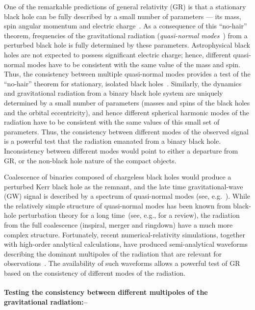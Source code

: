 \documentclass[prl,preprintnumbers,twocolumn,eqsecnum,floatfix,a4paper,nofootinbib,superscriptaddress]{revtex4}
\begin{document}
One of the remarkable predictions of general relativity (GR) is that a stationary black hole can be fully described by a small number of parameters --- its mass, spin angular momentum and electric charge~\cite{Israel:1967,Israel:1968,Carter:1978}. As a consequence of this ``no-hair'' theorem, frequencies of the gravitational radiation (\emph{quasi-normal modes}~\cite{Vishveshwara:1970zz,Press:1971wr,Chandrasekhar:1975zza}) from a perturbed black hole is fully determined by these parameters. Astrophysical black holes are not expected to possess significant electric charge; hence, different quasi-normal modes have to be consistent with the same value of the mass and spin. Thus, the consistency between multiple quasi-normal modes provides a test of the ``no-hair'' theorem for stationary, isolated black holes~\cite{Dreyer:2003bv}. Similarly, the dynamics and gravitational radiation from a binary black hole system are uniquely determined by a small number of parameters (masses and spins of the black holes and the orbital eccentricity), and hence different spherical harmonic modes of the radiation have to be consistent with the same values of this small set of parameters. Thus, the consistency between different modes of the observed signal is a powerful test that the radiation emanated from a binary black hole. Inconsistency between different modes would point to either a departure from GR, or the non-black hole nature of the compact objects. 

Coalescence of binaries composed of chargeless black holes would produce a perturbed Kerr black hole as the remnant, and the late time gravitational-wave (GW) signal is described by a spectrum of quasi-normal modes (see, e.g.~\cite{Buonanno:2006ui}). While the relatively simple structure of quasi-normal modes has been known from black-hole perturbation theory for a long time~(see, e.g., \cite{Berti:2009kk} for a review), the radiation from the full coalescence (inspiral, merger and ringdown) have a much more complex structure. Fortunately, recent numerical-relativity simulations, together with high-order analytical calculations, have produced semi-analytical waveforms describing the dominant multipoles of the radiation that are relevant for observations~\cite{Pan:2011gk,London:2017bcn,Mehta:2017jpq}. The availability of such waveforms allows a powerful test of GR based on the consistency of different modes of the radiation.  

\paragraph{Testing the consistency between different multipoles of the gravitational radiation:--}
\end{document}
